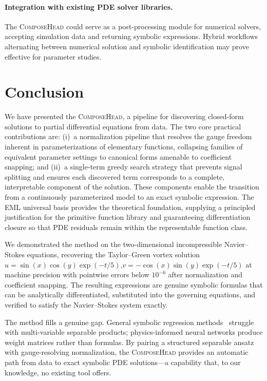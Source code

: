 \paragraph{Integration with existing PDE solver libraries.}
The \textsc{ComposeHead} could serve as a post-processing module for numerical
solvers, accepting simulation data and returning symbolic expressions.  Hybrid
workflows alternating between numerical solution and symbolic identification may
prove effective for parameter studies.


\section{Conclusion}
\label{sec:conclusion}

We have presented the \textsc{ComposeHead}, a pipeline for discovering
closed-form solutions to partial differential equations from data.  The two
core practical contributions are: (i)~a normalization pipeline that resolves
the gauge freedom inherent in parameterizations of elementary functions,
collapsing families of equivalent parameter settings to canonical forms amenable
to coefficient snapping; and (ii)~a single-term greedy search strategy that
prevents signal splitting and ensures each discovered term corresponds to a
complete, interpretable component of the solution.  These components enable the
transition from a continuously parameterized model to an exact symbolic
expression.  The EML universal basis provides the theoretical foundation,
supplying a principled justification for the primitive function library and
guaranteeing differentiation closure so that PDE residuals remain within the
representable function class.

We demonstrated the method on the two-dimensional incompressible Navier--Stokes
equations, recovering the Taylor--Green vortex solution
$u = \sin(x)\cos(y)\exp(-t/5)$,\;$v = -\cos(x)\sin(y)\exp(-t/5)$
at machine precision with pointwise errors below $10^{-6}$ after normalization
and coefficient snapping.  The resulting expressions are genuine symbolic
formulas that can be analytically differentiated, substituted into the governing
equations, and verified to satisfy the Navier--Stokes system exactly.

The method fills a genuine gap.  General symbolic regression
methods~\cite{cranmer2023,udrescu2020} struggle with multi-variable separable
products; physics-informed neural networks produce weight matrices rather than
formulas.  By pairing a structured separable ansatz with gauge-resolving
normalization, the \textsc{ComposeHead} provides an automatic path from data to
exact symbolic PDE solutions---a capability that, to our knowledge, no existing
tool offers.

